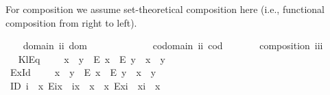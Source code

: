 \begin{isabellebody}
\begin{isamarkuptext}
For composition we assume set-theoretical composition here (i.e., functional 
composition from right to left). \label{IDMcL}%
\end{isamarkuptext}\isamarkuptrue%
\ \isamarkupfalse%
\isanewline
\ \ domain{\isacharcolon}{\isacharcolon}\ {\isachardoublequoteopen}i{\isasymRightarrow}i{\isachardoublequoteclose}\ {\isacharparenleft}{\isachardoublequoteopen}dom\ {\isacharunderscore}{\isachardoublequoteclose}\ {\isacharbrackleft}{}{}{}{\isacharbrackright}\ {}{}{}{\isacharparenright}\ \ \ \ \ \ \ \ \isanewline
\ \ codomain{\isacharcolon}{\isacharcolon}\ {\isachardoublequoteopen}i{\isasymRightarrow}i{\isachardoublequoteclose}\ {\isacharparenleft}{\isachardoublequoteopen}cod\ {\isacharunderscore}{\isachardoublequoteclose}\ {\isacharbrackleft}{}{}{}{\isacharbrackright}\ {}{}{}{\isacharparenright}\ \ \isanewline
\ \ composition{\isacharcolon}{\isacharcolon}\ {\isachardoublequoteopen}i{\isasymRightarrow}i{\isasymRightarrow}i{\isachardoublequoteclose}\ {\isacharparenleft}\ {\isachardoublequoteopen}{\isasymcdot}{\isachardoublequoteclose}\ {}{}{}{\isacharparenright}\isanewline
\isanewline
\ %
\isanewline
\ \isamarkupfalse%
\ KlEq\ {\isacharparenleft}\ {\isachardoublequoteopen}{\isasymcong}{\isachardoublequoteclose}\ {}{}{\isacharparenright}\ \ {\isachardoublequoteopen}x\ {\isasymcong}\ y\ {\isasymequiv}\ {\isacharparenleft}E\ x\ \isactrlbold {\isasymor}\ E\ y{\isacharparenright}\ \isactrlbold {\isasymrightarrow}\ x\ \isactrlbold {\isacharequal}\ y{\isachardoublequoteclose}\ \ \isanewline
\ %
\ \isanewline
\ \isamarkupfalse%
\ ExId\ {\isacharparenleft}\ {\isachardoublequoteopen}{\isasymsimeq}{\isachardoublequoteclose}\ {}{}{\isacharparenright}\ \ {\isachardoublequoteopen}x\ {\isasymsimeq}\ y\ {\isasymequiv}\ {\isacharparenleft}E\ x\ \isactrlbold {\isasymand}\ E\ y\ \isactrlbold {\isasymand}\ x\ \isactrlbold {\isacharequal}\ y{\isacharparenright}{\isachardoublequoteclose}\ \ \isanewline
\isanewline
\ %
\isanewline
\ \isamarkupfalse%
\ {\isachardoublequoteopen}ID\ i\ {\isasymequiv}\ {\isacharparenleft}\isactrlbold {\isasymforall}x{\isachardot}\ E{\isacharparenleft}i{\isasymcdot}x{\isacharparenright}\ \isactrlbold {\isasymrightarrow}\ i{\isasymcdot}x\ {\isasymcong}\ x{\isacharparenright}\ \isactrlbold {\isasymand}\ {\isacharparenleft}\isactrlbold {\isasymforall}x{\isachardot}\ E{\isacharparenleft}x{\isasymcdot}i{\isacharparenright}\ \isactrlbold {\isasymrightarrow}\ x{\isasymcdot}i\ {\isasymcong}\ x{\isacharparenright}{\isachardoublequoteclose}\ \ \ \isanewline

\end{isabellebody}
